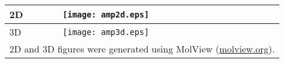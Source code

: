 \documentclass[review]{elsarticle}
\begin{document}
\begin{table}[H]
\begin{tabular}{|l|l|}
2D    & \texttt{[image: amp2d.eps]}  
\\ \hline

3D    &  \texttt{[image: amp3d.eps]}   
\\ \hline

\multicolumn{2}{l}{2D and 3D figures were generated using MolView (\url{molview.org}).} 
\end{tabular}
\end{table}
\end{document}
